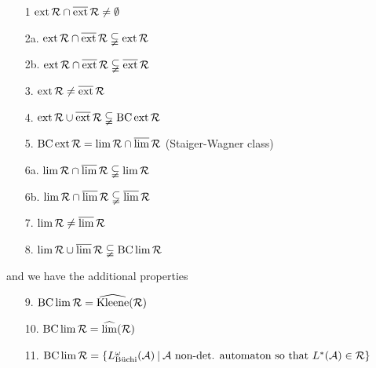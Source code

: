\begin{lemma}
\label{P:reg-star}

\begin{enumerate}
\item[1] $\operatorname{ext} \mathcal{R} \cap \operatorname{\overline{ext}} \mathcal{R} \neq \emptyset$
\item[2a.] $\operatorname{ext} \mathcal{R} \cap \operatorname{\overline{ext}} \mathcal{R} \subsetneqq \operatorname{ext} \mathcal{R}$
\item[2b.] $\operatorname{ext} \mathcal{R} \cap \operatorname{\overline{ext}} \mathcal{R} \subsetneqq \operatorname{\overline{ext}} \mathcal{R}$
\item[3.] $\operatorname{ext} \mathcal{R} \neq \operatorname{\overline{ext}} \mathcal{R}$
\item[4.] $\operatorname{ext} \mathcal{R} \cup \operatorname{\overline{ext}} \mathcal{R} \subsetneqq \operatorname{BC} \operatorname{ext} \mathcal{R}$
\item[5.] $\operatorname{BC} \operatorname{ext} \mathcal{R} = \lim \mathcal{R} \cap \operatorname{\overline{lim}} \mathcal{R}$ (Staiger-Wagner class)
\item[6a.] $\lim \mathcal{R} \cap \operatorname{\overline{lim}} \mathcal{R} \subsetneqq \lim \mathcal{R}$
\item[6b.] $\lim \mathcal{R} \cap \operatorname{\overline{lim}} \mathcal{R} \subsetneqq \operatorname{\overline{lim}} \mathcal{R}$
\item[7.] $\lim \mathcal{R} \neq \operatorname{\overline{lim}} \mathcal{R}$
\item[8.] $\lim \mathcal{R} \cup \operatorname{\overline{lim}} \mathcal{R} \subsetneqq \operatorname{BC} \lim \mathcal{R}$
\end{enumerate}
and we have the additional properties
\begin{enumerate}
\item[9.] $\operatorname{BC} \lim \mathcal{R} = \operatorname{\widehat{Kleene}}(\mathcal{R})$
\item[10.] $\operatorname{BC} \lim \mathcal{R} = \operatorname{\widehat{lim}}(\mathcal{R})$
\item[11.] $\BC \lim \mathcal{R} = \Set{L_{\text{Büchi}}^\omega(\A)}{\A \text{ non-det. automaton so that } L^*(\A) \in \mathcal{R}}$
\end{enumerate}


\end{lemma}
